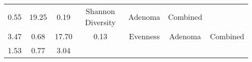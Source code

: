 \documentclass[12pt,]{article}
\begin{document}
\begin{longtable}[]{@{}ccccccc@{}}
\begin{minipage}[t]{0.16\columnwidth}
0.55\strut
\end{minipage} & \begin{minipage}[t]{0.16\columnwidth}\centering\strut
19.25\strut
\end{minipage} & \begin{minipage}[t]{0.07\columnwidth}\centering\strut
0.19\strut
\end{minipage} & \begin{minipage}[t]{0.14\columnwidth}\centering\strut
Shannon Diversity\strut
\end{minipage} & \begin{minipage}[t]{0.09\columnwidth}\centering\strut
Adenoma\strut
\end{minipage} & \begin{minipage}[t]{0.11\columnwidth}\centering\strut
Combined\strut
\end{minipage}\tabularnewline
\begin{minipage}[t]{0.09\columnwidth}\centering\strut
3.47\strut
\end{minipage} & \begin{minipage}[t]{0.16\columnwidth}\centering\strut
0.68\strut
\end{minipage} & \begin{minipage}[t]{0.16\columnwidth}\centering\strut
17.70\strut
\end{minipage} & \begin{minipage}[t]{0.07\columnwidth}\centering\strut
0.13\strut
\end{minipage} & \begin{minipage}[t]{0.14\columnwidth}\centering\strut
Evenness\strut
\end{minipage} & \begin{minipage}[t]{0.09\columnwidth}\centering\strut
Adenoma\strut
\end{minipage} & \begin{minipage}[t]{0.11\columnwidth}\centering\strut
Combined\strut
\end{minipage}\tabularnewline
\begin{minipage}[t]{0.09\columnwidth}\centering\strut
1.53\strut
\end{minipage} & \begin{minipage}[t]{0.16\columnwidth}\centering\strut
0.77\strut
\end{minipage} & \begin{minipage}[t]{0.16\columnwidth}\centering\strut
3.04\strut
\end{minipage} & \begin{minipage}[t]{0.07\columnwidth}\centering\strut

\end{minipage}
\end{longtable}
\end{document}
